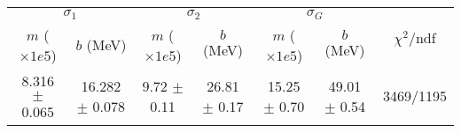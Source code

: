 \begin{tabular}{cc|cc|cc||c}
\multicolumn{2}{c|}{$\sigma_1$} & \multicolumn{2}{|c}{$\sigma_2$} & \multicolumn{2}{|c}{$\sigma_G$}  & \multirow{2}{*}{$\chi^2/$ndf}\\
$m$ ($\times1e5$) & $b$ (MeV) & $m$ ($\times1e5$) & $b$ (MeV) & $m$ ($\times1e5$) & $b$ (MeV) & \\
\hline
8.316 $\pm$ 0.065 & 16.282 $\pm$ 0.078 & 9.72 $\pm$ 0.11 & 26.81 $\pm$ 0.17 & 15.25 $\pm$ 0.70 & 49.01 $\pm$ 0.54 & 3469/1195\\
\end{tabular}
